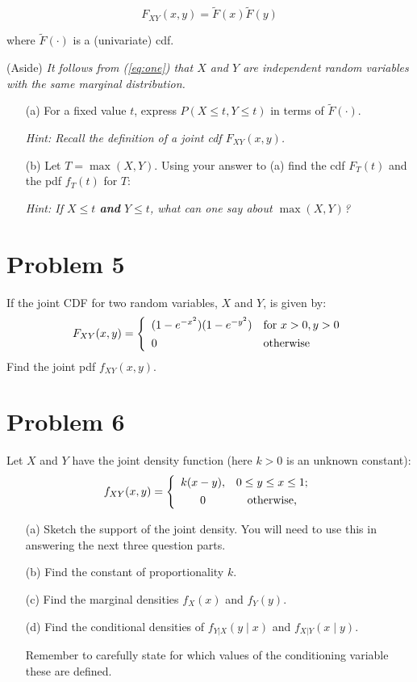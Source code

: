 \documentclass{article}
\newcommand{\1}{\mathbf{1}}
\begin{document}
\begin{equation}\label{eq:one}
F_{XY}(x,y) = \widetilde{F}(x)\widetilde{F}(y)
\end{equation}

where $\widetilde{F}(\cdot)$ is a (univariate) cdf. 

{{(Aside)} \it It follows from {\rm (\ref{eq:one})} that $X$ and $Y$ are independent random variables with the same
marginal distribution.} 

\begin{itemize}
    \item[(a)] For a fixed value $t$, express $P(X \leq t, Y \leq t)$ in terms of $\widetilde{F}(\cdot)$.\par
    {\it Hint: Recall the definition of  a joint cdf $F_{XY}(x,y)$.}
    
    \item[(b)] Let $T= \max (X,Y)$. Using your answer to (a) find the cdf $F_T(t)$ and the pdf $f_T(t)$ for $T$:\par
    {\it Hint: If $X\leq t$ {\bf and} $Y\leq t$, what can one say about $\max(X,Y)$?}

\end{itemize}




\newpage
\section*{Problem 5}  If the joint CDF for two random variables, $X$ and $Y$, is  
given by:
\[
F_{XY}(x,y) =\left\{\begin{array}{ll}
(1-e^{-x^2})(1-e^{-y^2}) & \hbox{for } x>0, y>0\\[4pt]
0 & \hbox{otherwise}
\end{array}
\right.
\]
Find the joint pdf $f_{XY}(x,y)$.



\newpage
\section*{Problem 6}  Let $X$ and $Y$ have the joint density function (here $k>0$ is an unknown constant):
\[
f_{XY}(x,y) = \left\{\begin{array}{cc}
k(x-y), & 0\leq y\leq x \leq 1;\\[4pt]
0 & \hbox{otherwise,}
\end{array}
\right.
\]

\begin{itemize}
\item[(a)] Sketch the support of the joint density. You will need to use this in answering the next three question parts.
\item[(b)] Find the constant of proportionality $k$.
\item[(c)] Find the marginal densities $f_X(x)$ and $f_Y(y)$.
\item[(d)] Find the conditional densities of $f_{Y|X}(y\mid x)$ and $f_{X|Y}(x\mid y)$.\par
 Remember to carefully state for which values of the conditioning variable these are defined.
\end{itemize}
\end{document}
